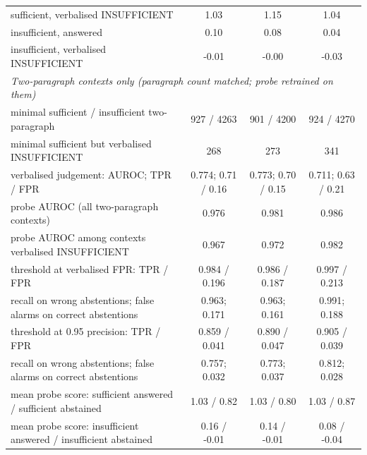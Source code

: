 \begin{tabular}{lccc}
\quad sufficient, verbalised INSUFFICIENT & 1.03 & 1.15 & 1.04 \\
\quad insufficient, answered & 0.10 & 0.08 & 0.04 \\
\quad insufficient, verbalised INSUFFICIENT & -0.01 & -0.00 & -0.03 \\
\midrule
\multicolumn{4}{l}{\emph{Two-paragraph contexts only (paragraph count matched; probe retrained on them)}} \\
\quad minimal sufficient / insufficient two-paragraph & 927 / 4263 & 901 / 4200 & 924 / 4270 \\
\quad minimal sufficient but verbalised INSUFFICIENT & 268 & 273 & 341 \\
\quad verbalised judgement: AUROC; TPR / FPR & 0.774; 0.71 / 0.16 & 0.773; 0.70 / 0.15 & 0.711; 0.63 / 0.21 \\
\quad probe AUROC (all two-paragraph contexts) & 0.976 & 0.981 & 0.986 \\
\quad probe AUROC among contexts verbalised INSUFFICIENT & 0.967 & 0.972 & 0.982 \\
\quad threshold at verbalised FPR: TPR / FPR & 0.984 / 0.196 & 0.986 / 0.187 & 0.997 / 0.213 \\
\qquad recall on wrong abstentions; false alarms on correct abstentions & 0.963; 0.171 & 0.963; 0.161 & 0.991; 0.188 \\
\quad threshold at 0.95 precision: TPR / FPR & 0.859 / 0.041 & 0.890 / 0.047 & 0.905 / 0.039 \\
\qquad recall on wrong abstentions; false alarms on correct abstentions & 0.757; 0.032 & 0.773; 0.037 & 0.812; 0.028 \\
\quad mean probe score: sufficient answered / sufficient abstained & 1.03 / 0.82 & 1.03 / 0.80 & 1.03 / 0.87 \\
\quad mean probe score: insufficient answered / insufficient abstained & 0.16 / -0.01 & 0.14 / -0.01 & 0.08 / -0.04 \\
\bottomrule
\end{tabular}